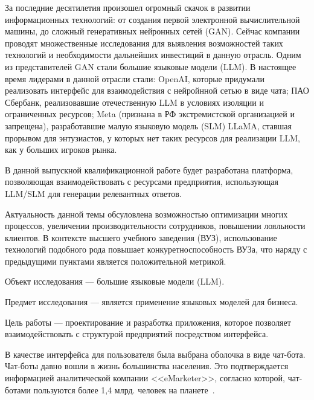 







За последние десятилетия произошел огромный скачок в развитии информационных технологий:
от создания первой электронной вычислительной машины, до сложный генеративных
нейронных сетей (GAN). Сейчас компании проводят множественные исследования
для выявления возможностей таких технологий и необходимости дальнейших
инвестиций в данную отрасль. Одним из представителей GAN стали большие языковые
модели (LLM). В настоящее время лидерами в данной отрасли стали: OpenAI,
которые придумали реализовать интерфейс для взаимодействия с нейройнной сетью 
в виде чата; ПАО Сбербанк, реализовавшие отечественную LLM в условиях изоляции
и ограниченных ресурсов; Meta (признана в РФ экстремистской организацией и 
запрещена), разработавшие малую языковую модель (SLM) LLaMA, ставшая прорывом 
для энтузиастов, у которых нет таких ресурсов для реализации LLM, как у 
больших игроков рынка.

В данной выпускной квалификационной работе 
будет разработана платформа, позволяющая взаимодействовать с ресурсами предприятия,
использующая LLM/SLM для генерации релевантных ответов.

Актуальность данной темы обсуловлена возможностью оптимизации многих процессов, 
увеличении производительности сотрудников, повышении лояльности клиентов.
В контексте высшего учебного заведения (ВУЗ), использование технологий подобного рода
повышает конкуретноспособность ВУЗа, что наряду с предыдущими пунктами является
положительной метрикой.

Объект исследования --- большие языковые модели (LLM).

Предмет исследования --- является применение языковых моделей для бизнеса.

Цель работы --- проектирование и разработка приложения, которое позволяет
взаимодействовать с структурой предприятий посредством интерфейса.

В качестве интерфейса для пользователя была выбрана оболочка в виде чат-бота.
Чат-боты давно вошли в жизнь большинства населения. Это подтверждается 
информацией аналитической компании <<eMarketer>>, согласно которой, чат-ботами
пользуются более 1,4 млрд. человек на планете~\cite{botucount}.

